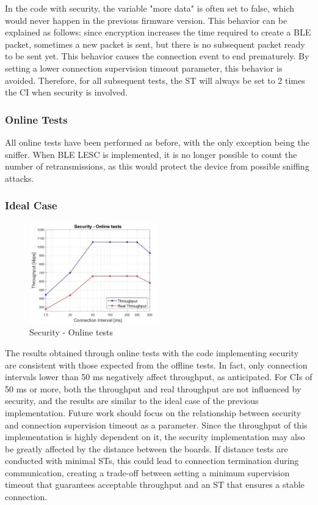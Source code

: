 \documentclass{Configuration_Files/PoliMi3i_thesis}
\begin{document}
In the code with security, the variable "more data" is often set to false, which would never happen in the previous firmware version. This behavior can be explained as follows: since encryption increases the time required to create a BLE packet, sometimes a new packet is sent, but there is no subsequent packet ready to be sent yet. This behavior causes the connection event to end prematurely. By setting a lower connection supervision timeout parameter, this behavior is avoided. Therefore, for all subsequent tests, the ST will always be set to 2 times the CI when security is involved.

\subsubsection*{Online Tests}

All online tests have been performed as before, with the only exception being the sniffer. When BLE LESC is implemented, it is no longer possible to count the number of retransmissions, as this would protect the device from possible sniffing attacks.

\subsubsection*{Ideal Case}

\begin{figure}[H]
    \centering
    \includegraphics[width=0.5\textwidth]{Results Manuel/figure12}
    \caption{Security - Online tests}
    \label{manuel_results_12}
\end{figure}

The results obtained through online tests with the code implementing security are consistent with those expected from the offline tests. In fact, only connection intervals lower than 50 ms negatively affect throughput, as anticipated. For CIs of 50 ms or more, both the throughput and real throughput are not influenced by security, and the results are similar to the ideal case of the previous implementation. Future work should focus on the relationship between security and connection supervision timeout as a parameter. Since the throughput of this implementation is highly dependent on it, the security implementation may also be greatly affected by the distance between the boards. If distance tests are conducted with minimal STs, this could lead to connection termination during communication, creating a trade-off between setting a minimum supervision timeout that guarantees acceptable throughput and an ST that ensures a stable connection.
\end{document}
